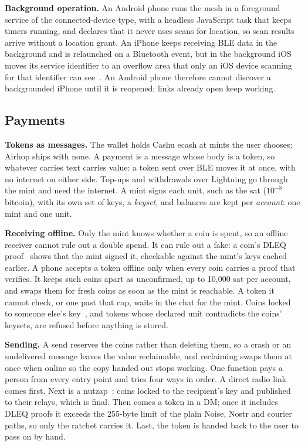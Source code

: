 \documentclass[conference]{IEEEtran}
\begin{document}
\textbf{Background operation.} An Android phone runs the mesh in a foreground service of the connected-device type, with a headless JavaScript task that keeps timers running, and declares that it never uses scans for location, so scan results arrive without a location grant. An iPhone keeps receiving BLE data in the background and is relaunched on a Bluetooth event, but in the background iOS moves its service identifier to an overflow area that only an iOS device scanning for that identifier can see~\cite{applecbbackground}. An Android phone therefore cannot discover a backgrounded iPhone until it is reopened; links already open keep working.

\subsection{Payments}
\label{sec:payments}

\textbf{Tokens as messages.} The wallet holds Cashu ecash at mints the user chooses; Airhop ships with none. A payment is a message whose body is a token, so whatever carries text carries value: a token sent over BLE moves it at once, with no internet on either side. Top-ups and withdrawals over Lightning go through the mint and need the internet. A mint signs each unit, such as the sat ($10^{-8}$ bitcoin), with its own set of keys, a \emph{keyset}, and balances are kept per \emph{account}: one mint and one unit.

\textbf{Receiving offline.} Only the mint knows whether a coin is spent, so an offline receiver cannot rule out a double spend. It can rule out a fake: a coin's DLEQ proof~\cite{nut12} shows that the mint signed it, checkable against the mint's keys cached earlier. A phone accepts a token offline only when every coin carries a proof that verifies. It keeps such coins apart as unconfirmed, up to 10,000 sat per account, and swaps them for fresh coins as soon as the mint is reachable. A token it cannot check, or one past that cap, waits in the chat for the mint. Coins locked to someone else's key~\cite{nut11}, and tokens whose declared unit contradicts the coins' keysets, are refused before anything is stored.

\textbf{Sending.} A send reserves the coins rather than deleting them, so a crash or an undelivered message leaves the value reclaimable, and reclaiming swaps them at once when online so the copy handed out stops working. One function pays a person from every entry point and tries four ways in order. A direct radio link comes first. Next is a nutzap~\cite{nip61}: coins locked to the recipient's key and published to their relays, which is final. Then comes a token in a DM; once it includes DLEQ proofs it exceeds the 255-byte limit of the plain Noise, Nostr and courier paths, so only the ratchet carries it. Last, the token is handed back to the user to pass on by hand.
\end{document}
